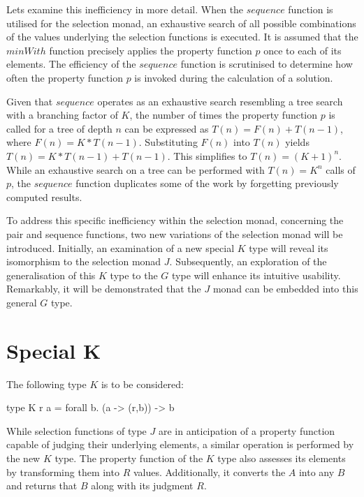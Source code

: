 \documentclass[runningheads]{llncs}
\begin{document}
Lets examine this inefficiency in more detail. When the \(sequence\)
function is utilised for the selection monad, an exhaustive search of
all possible combinations of the values underlying the selection
functions is executed. It is assumed that the \(minWith\) function
precisely applies the property function \(p\) once to each of its
elements. The efficiency of the \(sequence\) function is scrutinised to
determine how often the property function \(p\) is invoked during the
calculation of a solution.

\qquad Given that \(sequence\) operates as an exhaustive search
resembling a tree search with a branching factor of \(K\), the number of
times the property function \(p\) is called for a tree of depth \(n\)
can be expressed as \(T(n) = F(n) + T(n-1)\), where
\(F(n) = K * T(n-1)\). Substituting \(F(n)\) into \(T(n)\) yields
\(T(n) = K * T(n-1) + T(n-1)\). This simplifies to \(T(n) = (K + 1)^n\).
While an exhaustive search on a tree can be performed with
\(T(n) = K^n\) calls of \(p\), the \(sequence\) function duplicates some
of the work by forgetting previously computed results.

\qquad To address this specific inefficiency within the selection monad,
concerning the pair and sequence functions, two new variations of the
selection monad will be introduced. Initially, an examination of a new
special \(K\) type will reveal its isomorphism to the selection monad
\(J\). Subsequently, an exploration of the generalisation of this \(K\)
type to the \(G\) type will enhance its intuitive usability. Remarkably,
it will be demonstrated that the \(J\) monad can be embedded into this
general \(G\) type.

\section{Special K}\label{special-k}

The following type \(K\) is to be considered:

\begin{code}
type K r a = forall b. (a -> (r,b)) -> b
\end{code}

While selection functions of type \(J\) are in anticipation of a
property function capable of judging their underlying elements, a
similar operation is performed by the new \(K\) type. The property
function of the \(K\) type also assesses its elements by transforming
them into \(R\) values. Additionally, it converts the \(A\) into any
\(B\) and returns that \(B\) along with its judgment \(R\).
\end{document}
